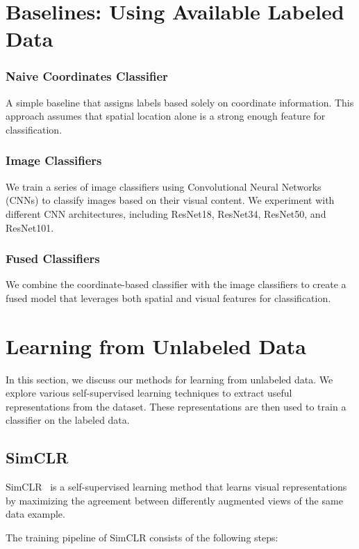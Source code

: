 \documentclass{article}
\begin{document}
\section{Baselines: Using Available Labeled Data}

\subsubsection{Naive Coordinates Classifier}
A simple baseline that assigns labels based solely on coordinate information.
This approach assumes that spatial location alone is a strong enough feature
for classification.

\subsubsection{Image Classifiers}
We train a series of image classifiers using Convolutional Neural Networks
(CNNs) to classify images based on their visual content. We experiment with
different CNN architectures, including ResNet18, ResNet34, ResNet50, and
ResNet101.

\subsubsection{Fused Classifiers}
We combine the coordinate-based classifier with the image classifiers to create
a fused model that leverages both spatial and visual features for
classification.

\section{Learning from Unlabeled Data}

In this section, we discuss our methods for learning from unlabeled data. We
explore various self-supervised learning techniques to extract useful
representations from the dataset. These representations are then used to train
a classifier on the labeled data.

\subsection{SimCLR}
SimCLR~\cite{simclr} is a self-supervised learning method that learns visual
representations by maximizing the agreement between differently augmented views
of the same data example.

The training pipeline of SimCLR consists of the following steps:
\end{document}
